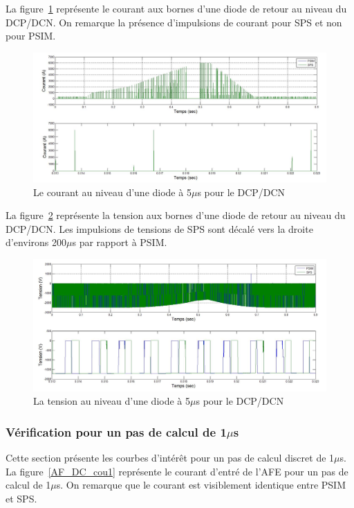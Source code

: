 \documentclass[11pt,letterpaper,final]{report}
\begin{document}
La figure~\ref{AF_DC_HA5} représente le courant aux bornes d'une diode de retour au niveau du DCP/DCN. On remarque la présence d'impulsions de courant pour SPS et non pour PSIM.

\begin{figure}[htb]
\centering
\includegraphics[scale=0.5]{Fig/DCP_AFE/5u/hash_diode_cou.jpg}
\caption{Le courant au niveau d'une diode à 5$\mu$s pour le DCP/DCN}
\label{AF_DC_HA5}
\end{figure}

La figure~\ref{AF_DC_HV5} représente la tension aux bornes d'une diode de retour au niveau du DCP/DCN. Les impulsions de tensions de SPS sont décalé vers la droite d'environs 200$\mu$s par rapport à PSIM.

\begin{figure}[htb]
\centering
\includegraphics[scale=0.5]{Fig/DCP_AFE/5u/hash_diode.jpg}
\caption{La tension au niveau d'une diode à 5$\mu$s pour le DCP/DCN}
\label{AF_DC_HV5}
\end{figure}


\clearpage
\subsubsection{Vérification pour un pas de calcul de 1$\mu$s}
Cette section présente les courbes d'intérêt pour un pas de calcul discret de 1$\mu$s. La figure~\ref{AF_DC_cou1} représente le courant d'entré de l'AFE pour un pas de calcul de 1$\mu$s. On remarque que le courant est visiblement identique entre PSIM et SPS.
\end{document}
